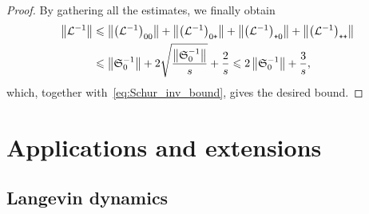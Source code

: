 \documentclass[AHL,Unicode,longabstracts,MathTools,published]{cedram}
\newcommand{\cL}{\mathcal{L}}
\newcommand{\Schur}{\mathfrak{S}_0}
\newcommand{\subplus}{\textnormal{\texttt{+}}}
\renewcommand{\le}{\leqslant}
\begin{document}
\begin{proof}
By gathering all the estimates, we finally obtain
\begin{align*}
\left\|\cL^{-1}\right\| &\le \left\|\left(\cL^{-1}\right)_{00}\right\| + \left\|\left(\cL^{-1}\right)_{0\subplus}\right\| + \left\|\left(\cL^{-1}\right)_{\subplus0}\right\| + \left\|\left(\cL^{-1}\right)_{\subplus\subplus}\right\|\\
&\le \left\|\Schur^{-1}\right\| + 2 \sqrt{\frac {\left\|\Schur^{-1}\right\|} { s}} + \frac 2 s \le 2\left\|\Schur^{-1}\right\| + \frac 3 s,
\end{align*}
which, together with~\eqref{eq:Schur_inv_bound}, gives the desired bound.
\end{proof}

\section{Applications and extensions}\label{sec:applications}

\subsection{Langevin dynamics}\label{sec:application_Langevin}
\end{document}
